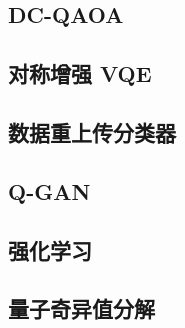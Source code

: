\subsection{DC-QAOA}


\subsection{对称增强 VQE}


\subsection{数据重上传分类器}


\subsection{Q-GAN}


\subsection{强化学习}


\subsection{量子奇异值分解}

